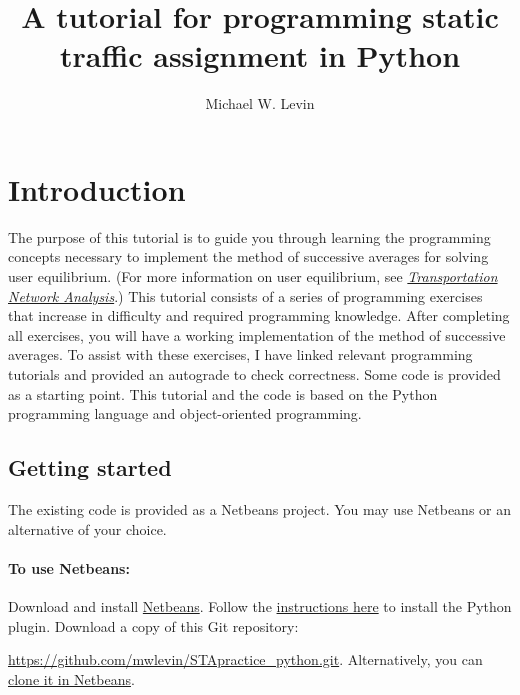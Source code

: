 \documentclass[11pt]{article}
\begin{document}
	\allowdisplaybreaks[1]
	
	
	\title{A tutorial for programming static traffic assignment in Python}
	
	\author{Michael W. Levin}
	
	\maketitle
	
\section{Introduction}

The purpose of this tutorial is to guide you through learning the programming concepts necessary to implement the method of successive averages for solving user equilibrium. (For more information on user equilibrium, see \href{https://sboyles.github.io/blubook.html}{\textit{Transportation Network Analysis}}.)
This tutorial consists of a series of programming exercises that increase in difficulty and required programming knowledge. After completing all exercises, you will have a working implementation of the method of successive averages. 
To assist with these exercises, I have linked relevant programming tutorials and provided an autograde to check correctness. Some code is provided as a starting point. 
This tutorial and the code is based on the Python programming language and object-oriented programming.
%


\subsection{Getting started}
\label{sec11}

The existing code is provided as a Netbeans project. You may use Netbeans or an alternative of your choice.
\paragraph*{To use Netbeans:} Download and install \href{https://netbeans.apache.org/download/index.html}{Netbeans}. Follow the \href{https://plugins.netbeans.apache.org/catalogue/?id=89}{instructions here} to install the Python plugin. Download a copy of this Git repository:

\noindent \href{https://github.com/mwlevin/STApractice_python.git}{https://github.com/mwlevin/STApractice\_python.git}. Alternatively, you can \href{https://netbeans.org/kb/docs/ide/git.html#clone}{clone it in Netbeans}.
\end{document}
